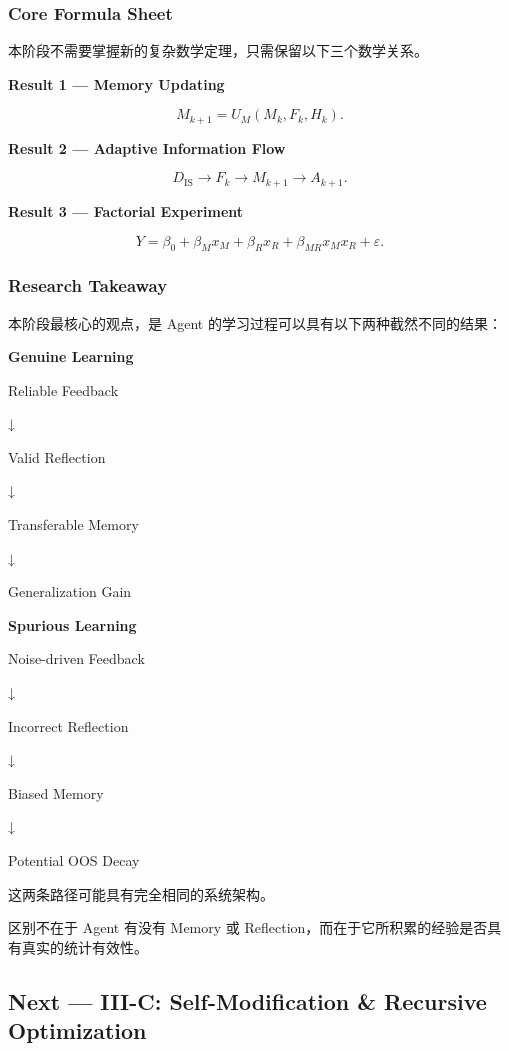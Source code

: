 \hypertarget{part-3-34-0001-core-formula-sheet}{%
\subsubsection{Core Formula Sheet}\label{part-3-34-0001-core-formula-sheet}}

本阶段不需要掌握新的复杂数学定理，只需保留以下三个数学关系。

\textbf{Result 1 --- Memory Updating}

\[M_{k+1}=U_M(M_k,F_k,H_k).\]

\textbf{Result 2 --- Adaptive Information Flow}

\[D_{\mathrm{IS}}
\longrightarrow F_k
\longrightarrow M_{k+1}
\longrightarrow A_{k+1}.\]

\textbf{Result 3 --- Factorial Experiment}

\[Y=\beta_0+\beta_Mx_M+\beta_Rx_R
+\beta_{MR}x_Mx_R+\varepsilon.\]

\hypertarget{part-3-34-0001-research-takeaway}{%
\subsubsection{Research Takeaway}\label{part-3-34-0001-research-takeaway}}

本阶段最核心的观点，是 Agent 的学习过程可以具有以下两种截然不同的结果：

\textbf{Genuine Learning}

Reliable Feedback

↓

Valid Reflection

↓

Transferable Memory

↓

Generalization Gain

\textbf{Spurious Learning}

Noise-driven Feedback

↓

Incorrect Reflection

↓

Biased Memory

↓

Potential OOS Decay

这两条路径可能具有完全相同的系统架构。

区别不在于 Agent 有没有 Memory 或 Reflection，而在于它所积累的经验是否具有真实的统计有效性。

\hypertarget{part-3-34-0001-next-iii-c-self-modification-recursive-optimization}{%
\subsection{Next --- III-C: Self-Modification \& Recursive Optimization}\label{part-3-34-0001-next-iii-c-self-modification-recursive-optimization}}

